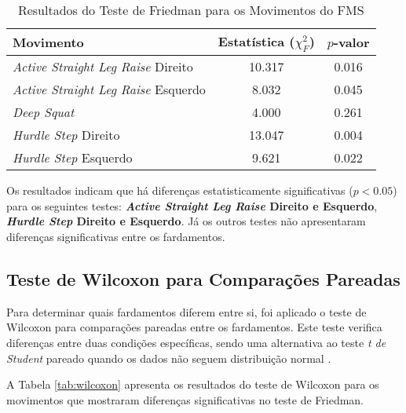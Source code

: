         \begin{table}[H]
            \centering
            \caption{Resultados do Teste de Friedman para os Movimentos do FMS}
            \label{tab:friedman}
            \begin{tabular}{lcc}
                \hline
                \textbf{Movimento} & \textbf{Estatística ($\chi^2_F$)} & \textbf{$p$-valor} \\
                \hline
                \textit{Active Straight Leg Raise} Direito  & 10.317 & 0.016  \\
                \textit{Active Straight Leg Raise} Esquerdo &  8.032 & 0.045  \\
                \textit{Deep Squat}                        &  4.000 & 0.261  \\
                \textit{Hurdle Step} Direito               & 13.047 & 0.004  \\
                \textit{Hurdle Step} Esquerdo              &  9.621 & 0.022  \\
                \hline
            \end{tabular}
            \end{table}

        Os resultados indicam que há diferenças estatisticamente significativas ($p < 0.05$) para os seguintes testes: \textbf{\textit{Active Straight Leg Raise} Direito e Esquerdo}, \textbf{\textit{Hurdle Step} Direito e Esquerdo}. Já os outros testes não apresentaram diferenças significativas entre os fardamentos.

    \subsection{Teste de Wilcoxon para Comparações Pareadas}
        Para determinar quais fardamentos diferem entre si, foi aplicado o teste de Wilcoxon para comparações pareadas entre os fardamentos. Este teste verifica diferenças entre duas condições específicas, sendo uma alternativa ao teste \textit{t de Student} pareado quando os dados não seguem distribuição normal \cite{azevedo2018metodos}.

        A Tabela \ref{tab:wilcoxon} apresenta os resultados do teste de Wilcoxon para os movimentos que mostraram diferenças significativas no teste de Friedman.

